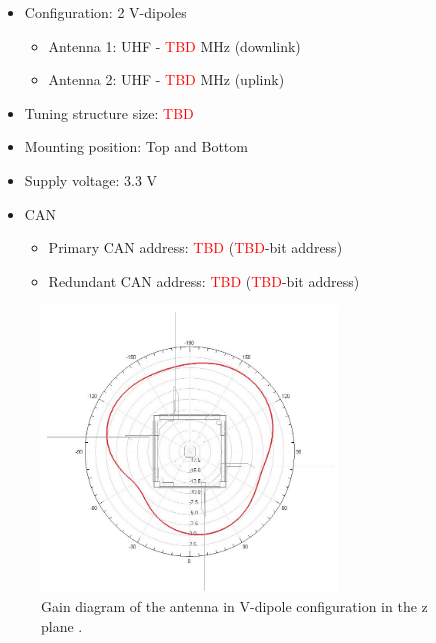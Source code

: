 \begin{itemize}
    \item Configuration: 2 V-dipoles 
        \begin{itemize}
            \item Antenna 1: UHF - \textcolor{red}{TBD} MHz (downlink)
            \item Antenna 2: UHF - \textcolor{red}{TBD} MHz (uplink)
        \end{itemize}
    \item Tuning structure size: \textcolor{red}{TBD}
    \item Mounting position: Top and Bottom
    \item Supply voltage: 3.3 V
    \item CAN 
        \begin{itemize}
            \item Primary CAN address: \textcolor{red}{TBD} (\textcolor{red}{TBD}-bit address)
            \item Redundant CAN address: \textcolor{red}{TBD} (\textcolor{red}{TBD}-bit address)
        \end{itemize}
\end{itemize}

\begin{figure}[!ht]
    \begin{center}
        \includegraphics[width=0.7\textwidth]{figures/subsystems/sat_2drad_dipv_z.jpg}
        \caption{ Gain diagram of the antenna in V-dipole configuration in the z plane \cite{ant-rad}.}
        \label{fig:ant-rad}
    \end{center}
\end{figure}

